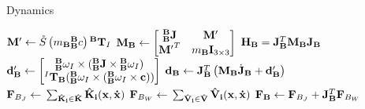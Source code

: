 \begin{algorithm}[H]
	\caption{Dynamics}\label{alg:dynamics}
	\begin{algorithmic}
		\State $\M' \gets \S{m_\B {\BB}c}{^\B\T_I}$
		\State $\M_\B \gets \begin{bmatrix}{\BB\J} & \M' \\ {\M'}^T & m_\B\EYE_{3 \times 3}\end{bmatrix}$
		\State $\H_\B = \J_\B^T \M_\B \J_\B$
		\State $\d_\B' \gets \begin{bmatrix}                            
		{\BB\omega_I } \times (\BB\J \times {\BB\omega_I}) \\
		{^I\T_\B}  (\BB\omega_I \times (\BB\omega_I \times \com))\\
		\end{bmatrix}$
		\State $\d_\B  \gets \J^T_\B \left (\M_\B \dotJ_\B + \d'_\B \right)$
		\State $\F_{B_J} \gets \Big.\sum_{\mathbf{\hat{K}_i} \in \mathbf{\hat{K}}}\mathbf{\hat{K}_i(\x, \dotx)} $
		\State $\F_{B_W} \gets \Big.\sum_{\mathbf{\hat{V}_i} \in \mathbf{\hat{V}}}\mathbf{\hat{V}_i(\x, \dotx)} $
		\State $\F_\B \gets \F_{B_J} + \J_\B^T \F_{B_W}$
	\end{algorithmic}
\end{algorithm}

